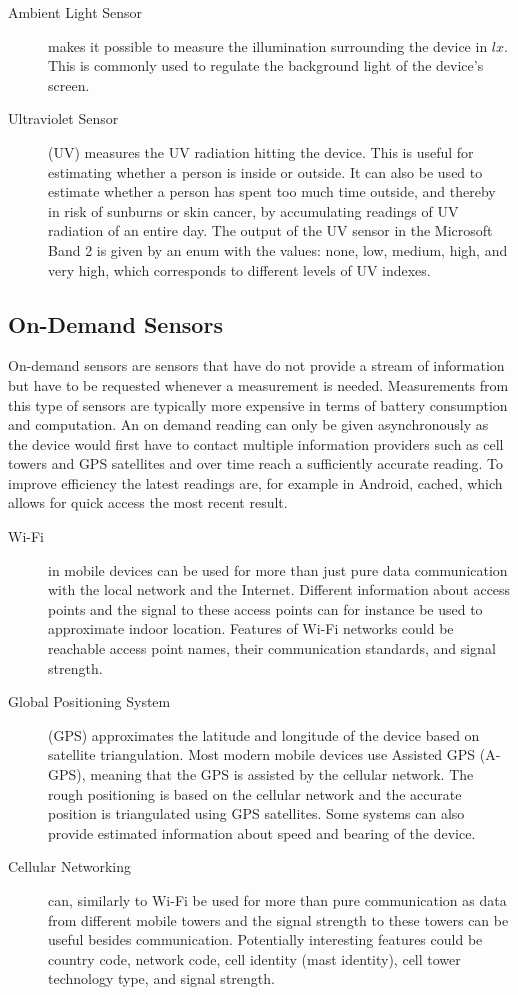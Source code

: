 \begin{description}
    \item[Ambient Light Sensor] makes it possible to measure the illumination surrounding the device in $lx$. This is commonly used to regulate the background light of the device's screen.
    \item[Ultraviolet Sensor] (UV) measures the UV radiation hitting the device. This is useful for estimating whether a person is inside or outside. It can also be used to estimate whether a person has spent too much time outside, and thereby in risk of sunburns or skin cancer, by accumulating readings of UV radiation of an entire day. The output of the UV sensor in the Microsoft Band 2 is given by an enum with the values: none, low, medium, high, and very high, which corresponds to different levels of UV indexes. 
\end{description}

\subsection{On-Demand Sensors}
On-demand sensors are sensors that have do not provide a stream of information but have to be requested whenever a measurement is needed. Measurements from this type of sensors are typically more expensive in terms of battery consumption and computation. An on demand reading can only be given asynchronously as the device would first have to contact multiple information providers such as cell towers and GPS satellites and over time reach a sufficiently accurate reading. To improve efficiency the latest readings are, for example in Android, cached, which allows for quick access the most recent result.

\begin{description}
    \item[Wi-Fi] in mobile devices can be used for more than just pure data communication with the local network and the Internet. Different information about access points and the signal to these access points can for instance be used to approximate indoor location. Features of Wi-Fi networks could be reachable access point names, their communication standards, and signal strength. 
    \item[Global Positioning System] (GPS) approximates the latitude and longitude of the device based on satellite triangulation. Most modern mobile devices use Assisted GPS (A-GPS), meaning that the GPS is assisted by the cellular network. The rough positioning is based on the cellular network and the accurate position is triangulated using GPS satellites. Some systems can also provide estimated information about speed and bearing of the device.
    \item[Cellular Networking] can, similarly to Wi-Fi be used for more than pure communication as data from different mobile towers and the signal strength to these towers can be useful besides communication. Potentially interesting features could be country code, network code, cell identity (mast identity), cell tower technology type, and signal strength.
\end{description}

